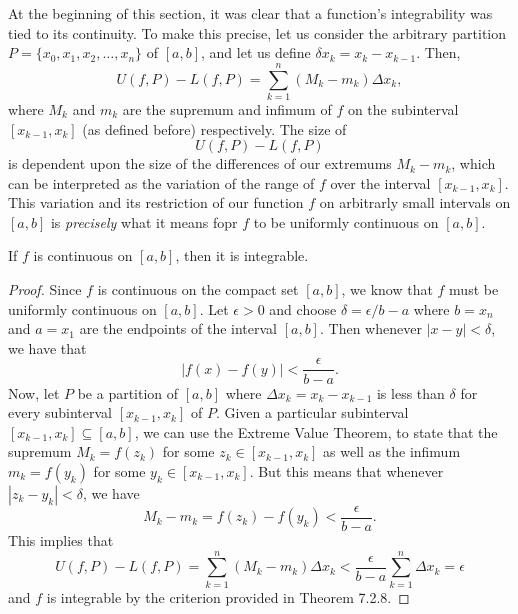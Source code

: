 At the beginning of this section, it was clear that a function's integrability was tied to its continuity. To make this precise, let us consider the arbitrary partition \( P = \{ x_{0}, x_{1}, x_{2}, \dots, x_{n} \}  \) of \( [a,b]  \), and let us define \( \delta x_{k } = x_{k } - x_{k-1 } \). Then, 
\[  U(f,P) - L(f,P) = \sum_{ k=1 }^{ n } (M_{k } - m_{k } ) \Delta x_{ k }, \]
where \( M _{k }  \) and \( m_{ k }  \) are the supremum and infimum of \( f  \) on the subinterval \( [x_{k -1 } , x_{ k  }] \) (as defined before) respectively. The size of 
\[  U(f,P) - L(f,P)   \] is dependent upon the size of the differences of our extremums \(  M_{k } - m_{k } \), which can be interpreted as the variation of the range of \( f  \) over the interval \( [x_{k-1 }, x_{k }] \). This variation and its restriction of our function \( f  \) on arbitrarly small intervals on \( [a,b]  \) is \textit{precisely} what it means fopr \( f  \) to be uniformly continuous on \( [a,b] \).

\begin{tcolorbox}
\begin{thm}
	If \( f  \) is continuous on \( [a,b] \), then it is integrable.
\end{thm}
\end{tcolorbox}

\begin{proof}
	Since \( f  \) is continuous on the compact set \( [a,b]  \), we know that \( f  \) must be uniformly continuous on \( [a,b]  \). Let \( \epsilon > 0  \) and choose \( \delta = \epsilon / b -a  \) where \( b = x_{n}   \) and \( a = x_{1}  \) are the endpoints of the interval \( [a,b ] \). Then whenever \( | x - y  | < \delta  \), we have that 
	\[  | f(x) - f(y)  | < \frac{ \epsilon  }{  b - a  }. \]
	Now, let \( P  \) be a partition of \( [a,b]  \) where \( \Delta x_{ k } = x_{ k } - x _{ k -1 } \) is less than \( \delta  \) for every subinterval \( [x_{k-1 } , x_{k }] \) of \( P  \). Given a particular subinterval \( [x_{k-1}, x_{ k } ] \subseteq [a,b]   \), we can use the Extreme Value Theorem, to state that the supremum \(  M_{k} = f(z_{k })  \) for some \( z_{k } \in [x_{ k-1 } , x_{k}]  \) as well as the infimum \( m_{k } = f(y_{k }) \) for some \( y_{ k } \in [x_{k -1 } , x_{ k }]  \). But this means that whenever \( | z_{k } - y_{k } | < \delta  \), we have 
	\[  M_{k } - m_{k } = f(z_{k}) - f(y_{k } ) < \frac{ \epsilon  }{  b -a  }. \]
	This implies that 
	\[  U(f, P ) - L(f,P ) = \sum_{ k=1 }^{ n } (M_{k } - m_{ k } ) \Delta x_{k} < \frac{ \epsilon  }{ b -a  }  \sum_{ k=1 }^{ n } \Delta x_{k} = \epsilon \]
	and \( f  \) is integrable by the criterion provided in Theorem 7.2.8.
\end{proof}



